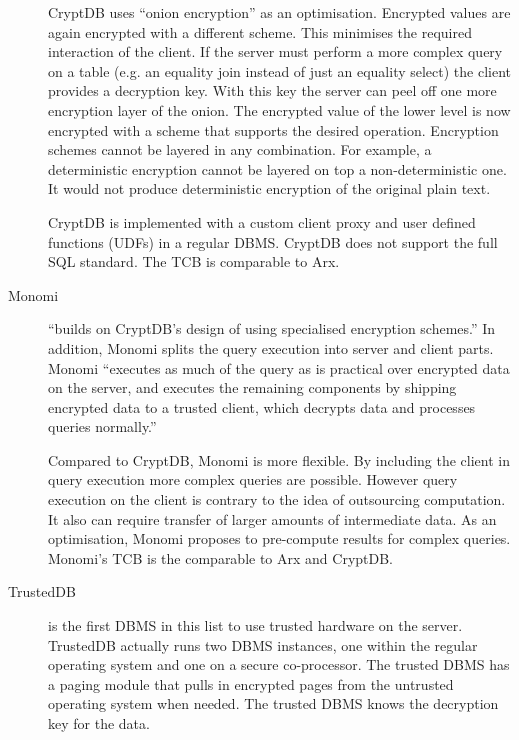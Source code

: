 \begin{description}
CryptDB uses ``onion encryption'' as an optimisation. Encrypted values are again encrypted with a different scheme. This minimises the required interaction of the client.\label{ID_854726664}
If the server must perform a more complex query on a table (e.g. an equality join instead of just an equality select) the client provides a decryption key. With this key the server can peel off one more encryption layer of the onion. The encrypted value of the lower level is now encrypted with a scheme that supports the desired operation.\label{ID_376662786}
Encryption schemes cannot be layered in any combination. For example, a deterministic encryption cannot be layered on top a non-deterministic one. It would not produce deterministic encryption of the original plain text.\label{ID_788200096}

CryptDB is implemented with a custom client proxy and user defined functions (UDFs) in a regular DBMS.\label{ID_80856373}
CryptDB does not support the full SQL standard.\label{ID_48235228}
The TCB is comparable to Arx.\label{ID_974649717}
\item[Monomi\cite{Tu2013}]\label{ID_59341931}
``builds on CryptDB’s design of using specialised encryption schemes.''\label{ID_1750364265}
In addition, Monomi splits the query execution into server and client parts.\label{ID_1050521028}
Monomi ``executes as much of the query as is practical over encrypted data on the server, and executes the remaining components by shipping encrypted data to a trusted client, which decrypts data and processes queries normally.''\label{ID_338326746}

Compared to CryptDB, Monomi is more flexible. By including the client in query execution more complex queries are possible.\label{ID_1200129751}
However query execution on the client is contrary to the idea of outsourcing computation. It also can require transfer of larger amounts of intermediate data.\label{ID_1650114031}
As an optimisation, Monomi proposes to pre-compute results for complex queries.\label{ID_889187327}
Monomi's TCB is the comparable to Arx and CryptDB.\label{ID_1247041878}
\item[TrustedDB\cite{trusteddb}]\label{ID_1697603520}
is the first DBMS in this list to use trusted hardware on the server.\label{ID_1008509812}
TrustedDB actually runs two DBMS instances, one within the regular operating system and one on a secure co-processor.\label{ID_1859428466}
The trusted DBMS has a paging module that pulls in encrypted pages from the untrusted operating system when needed.\label{ID_576475333}
The trusted DBMS knows the decryption key for the data.\label{ID_1595491732}


\end{description}
